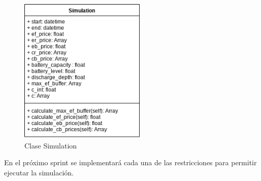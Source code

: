 \begin{figure}[!h]
        \centering
        \includegraphics[width=6cm]{figs/simulation_class.png}
        \caption{Clase Simulation}
        \label{fig:simulation}
\end{figure}

En el próximo sprint se implementará cada una de las restricciones para permitir ejecutar la simulación.
